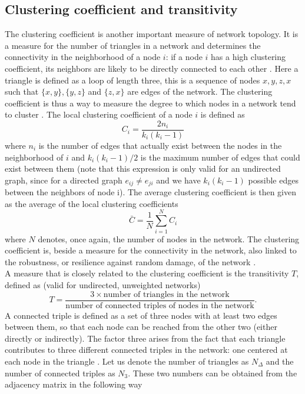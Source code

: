 \documentclass[11 pt , letterpaper , twoside , openright]{book}
\begin{document}
\subsection{Clustering coefficient and transitivity}

The clustering coefficient is another important measure of network topology. It is a measure for the number of triangles in a network and determines the connectivity in the neighborhood of a node $i$: if a node $i$ has a high clustering coefficient, its neighbors are likely to be directly connected to each other \cite{Li2017}. Here a triangle is defined as a loop of length three, this is a sequence of nodes $x, y, z, x$ such that $\{x, y\}, \{y, z\}$ and $\{z, x\}$ are edges of the network. The clustering coefficient is thus a way to measure the degree to which nodes in a network tend to cluster \cite{Li2017}. The local clustering coefficient of a node $i$ is defined as
\begin{equation}\label{clus}
	C_i = \frac{2n_i}{k_i(k_i-1)}
\end{equation}
where $n_i$ is the number of edges that actually exist between the nodes in the neighborhood of $i$ and $k_i(k_i-1)/2$ is the maximum number of edges that could exist between them (note that this expression is only valid for an undirected graph, since for a directed graph $e_{ij} \neq e_{ji}$ and we have $k_i(k_i-1)$ possible edges between the neighbors of node i). %
The average clustering coefficient is then given as the average of the local clustering coefficients
\begin{equation}\label{avClus}
	\bar{C} = \frac{1}{N}\sum_{i = 1}^N C_i
\end{equation}
where $N$ denotes, once again, the number of nodes in the network. The clustering coefficient is, beside a measure for the connectivity in the network, also linked to the robustness, or resilience against random damage,  of the network \cite{Iyer2013} \cite{Li2017}. \\
A measure that is closely related to the clustering coefficient is the transitivity $T$, defined as (valid for undirected, unweighted networks) \cite{F.Costa2007}
\begin{equation}\label{globalTrans}
	T = \frac{3 \times \text{number of triangles in the network}}{\text{number of connected triples of nodes in the network}}.
\end{equation}
A connected triple is defined as a set of three nodes with at least two edges between them, so that each node can be reached from the other two (either directly or indirectly). The factor three arises from the fact that each triangle contributes to three different connected triples in the network: one centered at each node in the triangle \cite{F.Costa2007}. Let us denote the number of triangles as $N_{\Delta}$ and the number of connected triples as $N_3$. These two numbers can be obtained from the adjacency matrix in the following way \cite{F.Costa2007}
\end{document}
